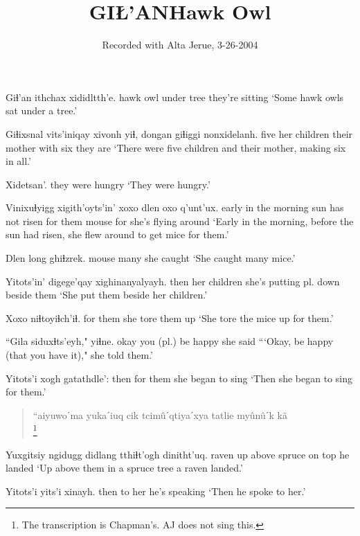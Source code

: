 \documentclass[12pt]{article}
\begin{document}
\title{GIŁ'AN\newline Hawk Owl}
\author{Recorded with Alta Jerue, 3-26-2004}
\date{}
\maketitle

\gll Giɬ'an ithchax xididltth'e.
{hawk owl} {under tree} {they're sitting}
\glt `Some hawk owls sat under a tree.'
\glend

\gll Giɬixsnal vits'iniqay xivonh yiɬ, {dongan giɬiggi} nonxidelanh.
five {her children} {their mother} with six {they are}
\glt `There were five children and their mother, making six in all.'
\glend

\gll Xidetsan'.
{{they were hungry}}
\glt `They were hungry.'
\glend

\gll Vinixuɬyigg xigith'oyts'in' xoxo dlen oxo q'unt'ux.
{early in the morning} {sun has not risen} {for them} mouse for {she's flying around}
\glt `Early in the morning, before the sun had risen, she flew around to get mice for them.'
\glend

\gll Dlen long ghiɬzrek.
mouse many {she caught}
\glt `She caught many mice.'
\glend

\gll Yitots'in' digege'qay xighinanyalyayh.
then {her children} {she's putting pl. down beside them}
\glt `She put them beside her children.'
\glend

\gll Xoxo niɬtoyiɬch'iɬ.
{for them} {she tore them up}
\glt `She tore the mice up for them.'
\glend

\gll ``Gila siduxɬts'eyh," yiɬne.
okay {you (pl.) be happy} {she said}
\glt ```Okay, be happy (that you have it)," she told them.'
\glend

\gll Yitots'i xogh gatathdle':
then {for them} {she began to sing}
\glt `Then she began to sing for them.'
\glend

\begin{verse}
``aiyuwoˊma yukaˊiuq cik tcim\^uˊqtiyaˊxya tatlie my\^un\^uˊk
k\"a\\\footnote{The transcription is Chapman's. AJ does not sing this.}
\end{verse}

\gll Yuxgitsiy ngidugg didlang tthiɬt'ogh dinitht'uq.
raven {up above} spruce {on top} {he landed}
\glt `Up above them in a spruce tree a raven landed.'
\glend

\gll Yitots'i yits'i xinayh.
then {to her} {he's speaking}
\glt `Then he spoke to her.'
\glend
\end{document}
